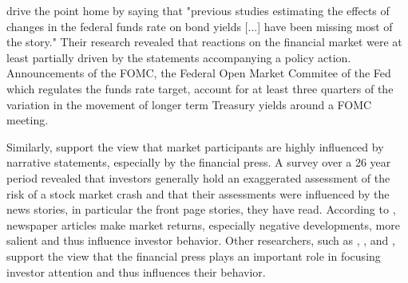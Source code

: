 \documentclass[11pt,a4paper,english,oneside]{book}
\numberwithin{equation}{chapter}
\begin{document}
\citet[~pp. 86--87]{Gurkaynak.2004} drive the point home by saying that "previous studies estimating the effects of changes in the federal funds rate on bond yields [...] have been missing most of the story." Their research revealed that reactions on the financial market were at least partially driven by the  statements accompanying a policy action. Announcements of the FOMC, the Federal Open Market Commitee of the Fed which regulates the funds rate target, account for at least three quarters of the variation in the movement of longer term Treasury yields around a FOMC meeting.

Similarly, \cite{Goetzmann.2016} support the view that market participants are highly influenced by narrative statements, especially by the financial press. A survey over a 26 year period revealed that investors generally hold an exaggerated assessment of the risk of a stock market crash and that their assessments were influenced by the news stories, in particular the front page stories, they have read. %
According to \cite{Goetzmann.2016}, newspaper articles make market returns, especially negative developments, more salient and thus influence investor behavior. Other researchers, such as \cite{Engelberg.2011}, \cite{Kraussl.2014}, and \cite{Yuan.2015}, support the view that the financial press plays an important role in focusing investor attention and thus influences their behavior.

\end{document}
